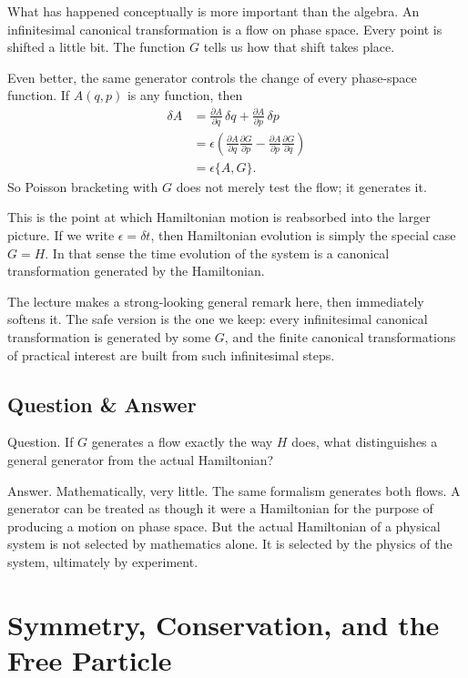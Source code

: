 What has happened conceptually is more important than the algebra. An infinitesimal canonical transformation is a flow on phase space. Every point is shifted a little bit. The function \(G\) tells us how that shift takes place.

Even better, the same generator controls the change of every phase-space function. If \(A(q,p)\) is any function, then
\begin{align}
\delta A
&=\frac{\partial A}{\partial q}\,\delta q+\frac{\partial A}{\partial p}\,\delta p \\
&=\epsilon\left(
\frac{\partial A}{\partial q}\frac{\partial G}{\partial p}
-
\frac{\partial A}{\partial p}\frac{\partial G}{\partial q}
\right) \\
&=\epsilon\{A,G\}.
\end{align}
So Poisson bracketing with \(G\) does not merely test the flow; it generates it.

This is the point at which Hamiltonian motion is reabsorbed into the larger picture. If we write \(\epsilon=\delta t\), then Hamiltonian evolution is simply the special case \(G=H\). In that sense the time evolution of the system is a canonical transformation generated by the Hamiltonian.

The lecture makes a strong-looking general remark here, then immediately softens it. The safe version is the one we keep: every infinitesimal canonical transformation is generated by some \(G\), and the finite canonical transformations of practical interest are built from such infinitesimal steps.

\subsection{Question \& Answer}

Question. If \(G\) generates a flow exactly the way \(H\) does, what distinguishes a general generator from the actual Hamiltonian?

Answer. Mathematically, very little. The same formalism generates both flows. A generator can be treated as though it were a Hamiltonian for the purpose of producing a motion on phase space. But the actual Hamiltonian of a physical system is not selected by mathematics alone. It is selected by the physics of the system, ultimately by experiment.

\section{Symmetry, Conservation, and the Free Particle}

